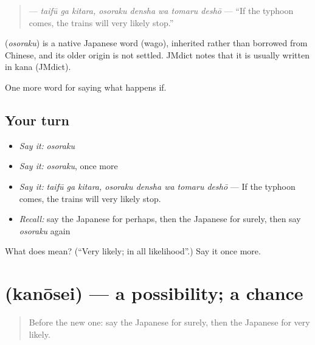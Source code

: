 \begin{quote}
\textbf{   } — \emph{taifū ga kitara, osoraku densha wa tomaru deshō} — \textquotedblleft{}If the typhoon comes, the trains will very likely stop.\textquotedblright{}
\end{quote}

\begin{cousinweb}
\textbf{} (\emph{osoraku}) is a native Japanese word (wago), inherited rather than borrowed from Chinese, and its older origin is not settled. JMdict notes that it is usually written in kana (JMdict).
\end{cousinweb}

\begin{grammarlens}[title={What you've built}]
One more word for saying what happens if.
\end{grammarlens}

\subsection*{Your turn}
\begin{itemize}
\raggedright
  \item \emph{Say it:} \emph{osoraku}
  \item \emph{Say it:} \emph{osoraku}, once more
  \item \emph{Say it:} \emph{taifū ga kitara, osoraku densha wa tomaru deshō} — If the typhoon comes, the trains will very likely stop.
  \item \emph{Recall:} say the Japanese for perhaps, then the Japanese for surely, then say \emph{osoraku} again
\end{itemize}

\begin{tcolorbox}[breakable,colback=teal!4,colframe=teal!35!black,title={Before you move on}]
What does  mean? (\textquotedblleft{}Very likely; in all likelihood\textquotedblright{}.) Say it once more.
\end{tcolorbox}
\section[\texorpdfstring{\ja{かのうせい} (kanōsei)}{かのうせい (kanōsei)}]{ (kanōsei) — a possibility; a chance}

\label{lesson:JA-C355-kanousei}



\begin{quote}
Before the new one: say the Japanese for surely, then the Japanese for very likely.
\end{quote}

